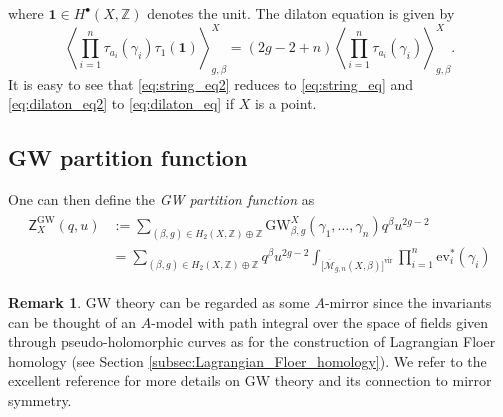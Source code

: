 \documentclass[11pt,colorinlistoftodos]{amsart}
\numberwithin{equation}{subsection}
\theoremstyle{plain}
\theoremstyle{definition}
\newtheorem{rem}[thm]{Remark}
\theoremstyle{remark}
\newcommand{\Z}{\mathbb{Z}}
\newcommand{\calM}{\mathcal{M}}
\begin{document}
where $\boldsymbol{1}\in H^\bullet(X,\Z)$ denotes the unit. The dilaton equation is given by 
\begin{equation}
    \label{eq:dilaton_eq2}
    \left\langle\prod_{i=1}^n\tau_{a_i}(\gamma_i)\tau_1(\boldsymbol{1})\right\rangle_{g,\beta}^X=(2g-2+n)\left\langle \prod_{i=1}^n\tau_{a_i}(\gamma_i)\right\rangle_{g,\beta}^X.
\end{equation}
It is easy to see that \eqref{eq:string_eq2} reduces to \eqref{eq:string_eq} and \eqref{eq:dilaton_eq2} to \eqref{eq:dilaton_eq} if $X$ is a point. 

\subsection{GW partition function}
One can then define the \emph{GW partition function} as 
\begin{align}
    \label{eq:GW_partition_function}
    \begin{split}
    \mathsf{Z}^\mathrm{GW}_X(q,u)&:=\sum_{(\beta,g)\in H_2(X,\mathbb{Z})\oplus \Z}\mathrm{GW}^X_{\beta,g}(\gamma_1,\ldots,\gamma_n)q^\beta u^{2g-2}\\
    &=\sum_{(\beta,g)\in H_2(X,\mathbb{Z})\oplus \Z}q^\beta u^{2g-2}\int_{\big[\overline{\calM}_{g,n}(X,\beta)\big]^\mathrm{vir}}\prod_{i=1}^n\mathrm{ev}^*_i(\gamma_i)
    \end{split}
\end{align}

\begin{rem}
GW theory can be regarded as some $A$-mirror since the invariants can be thought of an $A$-model with path integral over the space of fields given through pseudo-holomorphic curves as for the construction of Lagrangian Floer homology (see Section \ref{subsec:Lagrangian_Floer_homology}). We refer to the excellent reference \cite{HZKKTVPV2003} for more details on GW theory and its connection to mirror symmetry.
\end{rem}
\end{document}
